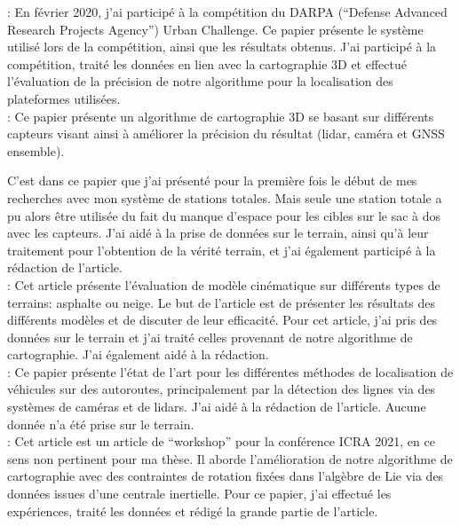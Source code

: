 \textbf{}:
En février 2020, j'ai participé à la compétition du DARPA (``Defense Advanced Research Projects Agency'') Urban Challenge. 
Ce papier présente le système utilisé lors de la compétition, ainsi que les résultats obtenus. 
J'ai participé à la compétition, traité les données en lien avec la cartographie 3D et effectué l'évaluation de la précision de notre algorithme pour la localisation des plateformes utilisées.
\\

\textbf{}: 
Ce papier présente un algorithme de cartographie 3D se basant sur différents capteurs visant ainsi à améliorer la précision du résultat (lidar, caméra et \ac{GNSS} ensemble).

C'est dans ce papier que j'ai présenté pour la première fois le début de mes recherches avec mon système de stations totales. 
Mais seule une station totale a pu alors être utilisée du fait du manque d'espace pour les cibles sur le sac à dos avec les capteurs.
J'ai aidé à la prise de données sur le terrain, ainsi qu'à leur traitement pour l'obtention de la vérité terrain, et j'ai également participé à la rédaction de l'article.
\\

\textbf{}:
Cet article présente l'évaluation de modèle cinématique sur différents types de terrains: asphalte ou neige. 
Le but de l'article est de présenter les résultats des différents modèles et de discuter de leur efficacité. 
Pour cet article, j'ai pris des données sur le terrain et j'ai traité celles provenant de notre algorithme de cartographie. 
J'ai également aidé à la rédaction.
\\

\textbf{}:
Ce papier présente l'état de l'art pour les différentes méthodes de localisation de véhicules sur des autoroutes, principalement par la détection des lignes via des systèmes de caméras et de lidars.
J'ai aidé à la rédaction de l'article. Aucune donnée n'a été prise sur le terrain.
\\

\textbf{}:
Cet article est un article de ``workshop'' pour la conférence ICRA 2021, en ce sens non pertinent pour ma thèse.
Il aborde l'amélioration de notre algorithme de cartographie avec des contraintes de rotation fixées dans l'algèbre de Lie via des données issues d'une centrale inertielle.
Pour ce papier, j'ai effectué les expériences, traité les données et rédigé la grande partie de l'article.